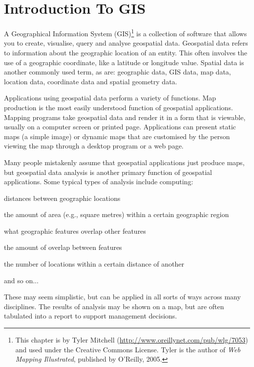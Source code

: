 \chapter{Introduction To GIS}
A Geographical Information System (GIS)\footnote{This chapter is by Tyler Mitchell
 (\url{http://www.oreillynet.com/pub/wlg/7053}) and
used under the Creative Commons License. Tyler is the author of \textit{Web
Mapping Illustrated}, published by O'Reilly, 2005.}
is a collection of software that allows you to create, visualise, query and
analyse geospatial data. Geospatial data refers to information about the
geographic location of an entity. This often involves the use of a geographic
coordinate, like a latitude or longitude value. Spatial data is another
commonly used term, as are: geographic data, GIS data, map data, location
data, coordinate data and spatial geometry data.

Applications using geospatial data perform a variety of functions. Map
production is the most easily understood function of geospatial applications.
Mapping programs take geospatial data and render it in a form that is
viewable, usually on a computer screen or printed page. Applications can
present static maps (a simple image) or dynamic maps that are customised by
the person viewing the map through a desktop program or a web page.

Many people mistakenly assume that geospatial applications just produce maps,
but geospatial data analysis is another primary function of geospatial
applications. Some typical types of analysis include computing:

\begin{compactenum}
\item distances between geographic locations
\item the amount of area (e.g., square metres) within a certain geographic region
\item what geographic features overlap other features
\item the amount of overlap between features
\item the number of locations within a certain distance of another
\item and so on...
\end{compactenum}

These may seem simplistic, but can be applied in all sorts of ways across many
disciplines. The results of analysis may be shown on a map, but are often
tabulated into a report to support management decisions.


